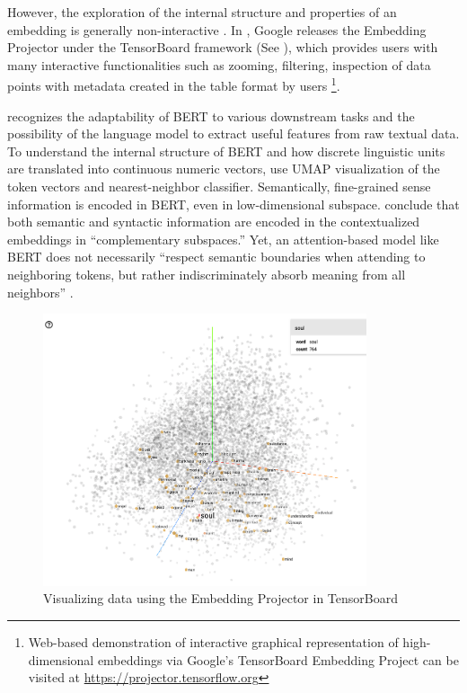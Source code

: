 However, the exploration of the internal structure and properties of an embedding is generally non-interactive \parencite{smilkov2016projector}. In \citeyear{smilkov2016projector}, Google releases the Embedding Projector under the TensorBoard framework (See ), which provides users with many interactive functionalities such as zooming, filtering, inspection of data points with metadata created in the table format by users \parencite{smilkov2016projector}\footnote{Web-based demonstration of interactive graphical representation of high-dimensional embeddings via Google's TensorBoard Embedding Project can be visited at \url{https://projector.tensorflow.org}}.

\textcite{coenen2019visualizing} recognizes the adaptability of BERT to various downstream tasks and the possibility of the language model to extract useful features from raw textual data. To understand the internal structure of BERT and how discrete linguistic units are translated into continuous numeric vectors, \textcite{coenen2019visualizing} use UMAP visualization of the token vectors and nearest-neighbor classifier. Semantically, fine-grained sense information is encoded in BERT, even in low-dimensional subspace. \textcite{coenen2019visualizing} conclude that both semantic and syntactic information are encoded in the contextualized embeddings in ``complementary subspaces.'' Yet, an attention-based model like BERT does not necessarily ``respect semantic boundaries when attending to neighboring tokens, but rather indiscriminately absorb meaning from all neighbors'' \parencite{coenen2019visualizing}.

\begin{figure}[H]
  \centering
  \includegraphics[width=0.85\textwidth,keepaspectratio]{figures_ref/embedding_projector_demo}
  \caption{Visualizing data using the Embedding Projector in TensorBoard} \label{fig:tensorboard_demo}
\end{figure}

